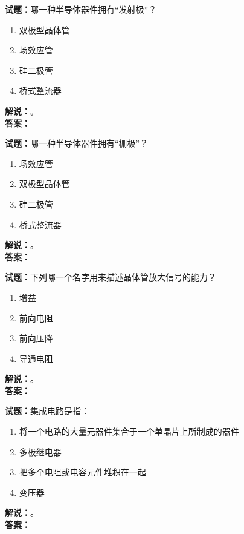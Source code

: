 \documentclass{ctexbook}
\begin{document}
\vspace{\baselineskip}

\noindent\textbf{试题：}哪一种半导体器件拥有“发射极”？
\begin{enumerate}[leftmargin=3em]
  \item 双极型晶体管
  \item 场效应管
  \item 硅二极管
  \item 桥式整流器
\end{enumerate}
\noindent\textbf{解说：}\textbf{}。\\\noindent\textbf{答案：}

\vspace{\baselineskip}

\noindent\textbf{试题：}哪一种半导体器件拥有“栅极”？
\begin{enumerate}[leftmargin=3em]
  \item 场效应管
  \item 双极型晶体管
  \item 硅二极管
  \item 桥式整流器
\end{enumerate}
\noindent\textbf{解说：}\textbf{}。\\\noindent\textbf{答案：}

\vspace{\baselineskip}

\noindent\textbf{试题：}下列哪一个名字用来描述晶体管放大信号的能力？
\begin{enumerate}[leftmargin=3em]
  \item 增益
  \item 前向电阻
  \item 前向压降
  \item 导通电阻
\end{enumerate}
\noindent\textbf{解说：}\textbf{}。\\\noindent\textbf{答案：}

\vspace{\baselineskip}

\noindent\textbf{试题：}集成电路是指：
\begin{enumerate}[leftmargin=3em]
  \item 将一个电路的大量元器件集合于一个单晶片上所制成的器件
  \item 多极继电器
  \item 把多个电阻或电容元件堆积在一起
  \item 变压器
\end{enumerate}
\noindent\textbf{解说：}\textbf{}。\\\noindent\textbf{答案：}
\end{document}
